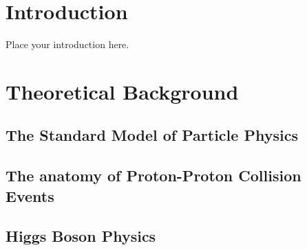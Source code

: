 








\tableofcontents

\listoftodos

\chapter{Introduction}
\label{sec:intro}



Place your introduction here.

\chapter{Theoretical Background}
\label{chap:theory}
\section{The Standard Model of Particle Physics}
\section{The anatomy of Proton-Proton Collision Events}
\section{Higgs Boson Physics}


